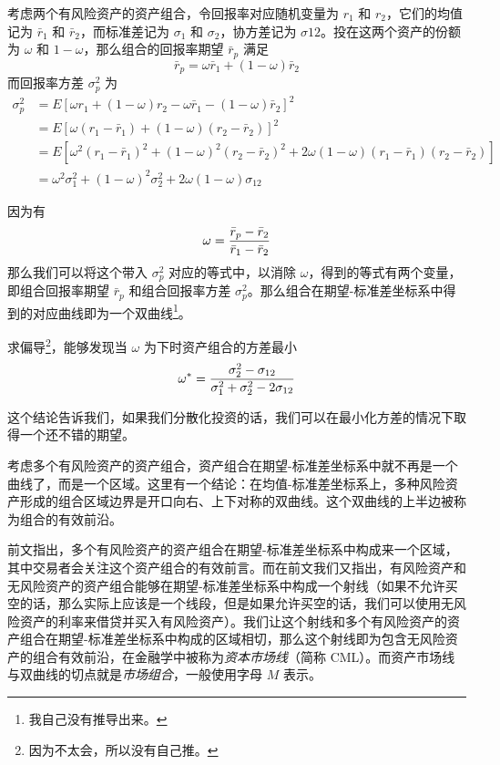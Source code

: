 \documentclass[utf8,a4paper,nofonts]{ctexbook}
\begin{document}
考虑两个有风险资产的资产组合，令回报率对应随机变量为 $r_1$ 和 $r_2$，它们的均值记为 $\bar{r}_1$ 和 $\bar{r}_2$，而标准差记为 $\sigma_1$ 和 $\sigma_2$，协方差记为 $\sigma{12}$。投在这两个资产的份额为 $\omega$ 和 $1 - \omega$，那么组合的回报率期望 $\bar{r}_p$ 满足
\[
    \bar{r}_p = \omega \bar{r}_1 + (1 - \omega) \bar{r}_2
\]
而回报率方差 $\sigma^2_p$ 为
\begin{align*}
    \sigma^2_p & = E\left[ \omega r_1 + (1 - \omega) r_2 - \omega \bar{r}_1 - (1 - \omega) \bar{r}_2 \right]^2 \\
               & = E\left[ \omega (r_1 - \bar{r}_1) + (1 - \omega) (r_2 - \bar{r}_2) \right]^2 \\
               & = E\left[ \omega^2 (r_1 - \bar{r}_1)^2 + (1 - \omega)^2 (r_2 - \bar{r}_2)^2 + 2 \omega (1 - \omega) (r_1 - \bar{r}_1) (r_2 - \bar{r}_2) \right] \\
               & = \omega^2 \sigma_1^2 + (1 - \omega)^2 \sigma_2^2 + 2 \omega (1 - \omega) \sigma_{12}
\end{align*}

因为有
\[
    \omega = {\bar{r}_p - \bar{r}_2 \over \bar{r}_1 - \bar{r}_2}
\]
那么我们可以将这个带入 $\sigma^2_p$ 对应的等式中，以消除 $\omega$，得到的等式有两个变量，即组合回报率期望 $\bar{r}_p$ 和组合回报率方差 $\sigma^2_p$。那么组合在期望-标准差坐标系中得到的对应曲线即为一个双曲线\footnote{我自己没有推导出来。}。

求偏导\footnote{因为不太会，所以没有自己推。}，能够发现当 $\omega$ 为下时资产组合的方差最小
\[
    \omega^* = {\sigma_2^2 - \sigma_{12} \over \sigma_1^2 + \sigma_2^2 - 2 \sigma_{12}}
\]

这个结论告诉我们，如果我们分散化投资的话，我们可以在最小化方差的情况下取得一个还不错的期望。

考虑多个有风险资产的资产组合，资产组合在期望-标准差坐标系中就不再是一个曲线了，而是一个区域。这里有一个结论：在均值-标准差坐标系上，多种风险资产形成的组合区域边界是开口向右、上下对称的双曲线。这个双曲线的上半边被称为组合的有效前沿。

前文指出，多个有风险资产的资产组合在期望-标准差坐标系中构成来一个区域，其中交易者会关注这个资产组合的有效前言。而在前文我们又指出，有风险资产和无风险资产的资产组合能够在期望-标准差坐标系中构成一个射线（如果不允许买空的话，那么实际上应该是一个线段，但是如果允许买空的话，我们可以使用无风险资产的利率来借贷并买入有风险资产）。我们让这个射线和多个有风险资产的资产组合在期望-标准差坐标系中构成的区域相切，那么这个射线即为包含无风险资产的组合有效前沿，在金融学中被称为\emph{资本市场线}（简称
CML）。而资产市场线与双曲线的切点就是\emph{市场组合}，一般使用字母 $M$ 表示。
\end{document}
